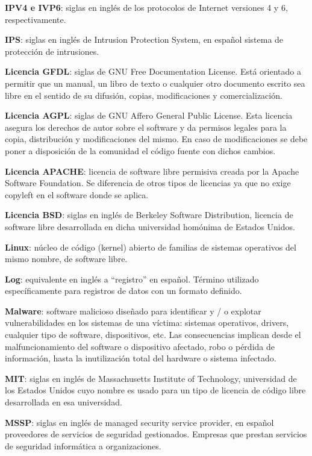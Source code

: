 \textbf{IPV4 e IVP6}: siglas en inglés de los protocolos de Internet versiones 4 y 6, respectivamente. \par

\textbf{IPS}: siglas en inglés de Intrusion Protection System, en español sistema de protección de intrusiones. \par

\textbf{Licencia GFDL}: siglas de GNU Free Documentation License. Está orientado a permitir que un manual, un libro de texto o cualquier  otro documento escrito sea libre en el sentido de su difusión, copias, modificaciones y comercialización. \par

\textbf{Licencia AGPL}: siglas de GNU Affero General Public License. Esta licencia asegura los derechos de autor sobre el software y da permisos legales para la copia, distribución y modificaciones del mismo. En caso de modificaciones se debe poner a disposición de la comunidad el código fuente con dichos cambios. \par

\textbf{Licencia APACHE}: licencia de software libre permisiva creada por la Apache Software Foundation. Se diferencia de otros tipos de licencias ya que no exige copyleft en el software donde se aplica. \par

\textbf{Licencia BSD}: siglas en inglés de Berkeley Software Distribution, licencia de software libre desarrollada en dicha universidad homónima de Estados Unidos. \par

\textbf{Linux}: núcleo de código (kernel) abierto de familias de sistemas operativos del mismo nombre, de software libre. \par

\textbf{Log}: equivalente en inglés a “registro” en español. Término utilizado específicamente para registros de datos con un formato definido. \par

\textbf{Malware}: software malicioso diseñado para identificar y / o explotar vulnerabilidades en  los sistemas de  una víctima: sistemas operativos, drivers, cualquier tipo de software, dispositivos, etc. Las consecuencias implican desde el malfuncionamiento del software o dispositivo afectado, robo o pérdida de información, hasta la inutilización total del hardware o sistema infectado. \par

\textbf{MIT}: siglas en inglés de Massachusetts Institute of Technology, universidad de los Estados Unidos cuyo nombre es usado para un tipo de licencia de código libre desarrollada en esa universidad. \par
\textbf{MSSP}: siglas 
en inglés de managed security service provider, en español proveedores de servicios de seguridad gestionados. Empresas que prestan servicios de seguridad informática a organizaciones. \par

